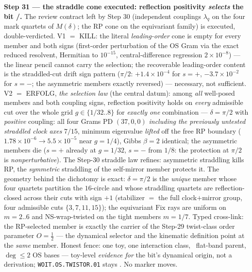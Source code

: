\documentclass[11pt,a4paper]{article}
\theoremstyle{definition}
\begin{document}
\par\smallskip\noindent\textbf{Step 31 --- the straddle cone executed: reflection positivity
\emph{selects} the bit \mE/\mC.} The review contract left by Step 30 (independent couplings
$\lambda_q$ on the four mark quartets of $M(\delta)$; the RP cone on the equivariant family) is
executed, double-verdicted. V1 $=$ KILL: the literal \emph{leading-order} cone is empty for every
member and both signs (first-order perturbation of the OS Gram via the exact reduced resolvent,
Hermitian to $10^{-15}$, central-difference regression $2\times10^{-8}$) --- the linear pencil
cannot carry the selection; the recoverable leading-order content is the straddled-cut drift sign
pattern ($\pi/2$: $+1.4\times10^{-4}$ for $s{=}+$, $-3.7\times10^{-2}$ for $s{=}-$; the asymmetric
members exactly reversed) --- necessary, not sufficient. V2 $=$ ERFOLG, \emph{the selection law}
(the central datum): among \emph{all} well-posed members and both coupling signs, reflection
positivity holds on \emph{every} admissible cut over the whole grid $g\in\{1/32..8\}$ for
\emph{exactly one} combination --- $\delta=\pi/2$ with \emph{positive} coupling: all four Grams PD
$(37,0,0)$ \emph{including the previously untested straddled clock axes} $7/15$, minimum
eigenvalue \emph{lifted} off the free RP boundary ($1.78\times10^{-6}\to5.5\times10^{-5}$ near
$g=1/4$), Gibbs $\beta=2$ identical; the asymmetric members die ($s{=}+$ already at $g=1/32$,
$s{=}-$ from $1/8$: the protection at $\pi/2$ is \emph{nonperturbative}). The Step-30 straddle law
refines: asymmetric straddling kills RP, the \emph{symmetric} straddling of the self-mirror member
protects it. The geometry behind the dichotomy is exact: $\delta=\pi/2$ is the \emph{unique}
member whose four quartets partition the $16$-circle and whose straddling quartets are
reflection-closed across their cuts with sign $+1$ (stabilizer $=$ the full clock$+$mirror group,
four admissible cuts $\{3,7,11,15\}$); the equivariant $\mathrm{Fix}$ rays are uniform on
$m=2..6$ and NS-wrap-twisted on the tight members $m=1/7$. Typed cross-link: the RP-selected
member is exactly the carrier of the Step-29 twist-class order parameter $O=\tfrac12$ --- the
dynamical selector and the kinematic definition point at the \emph{same} member. Honest fence:
one toy, one interaction class, \mC\ flat-band parent, $\deg\le2$ OS bases --- toy-level
\emph{evidence for} the bit's dynamical origin, not a derivation; \texttt{WOIT.OS.TWISTOR.01}
stays \mO. No marker moves.
\end{document}
